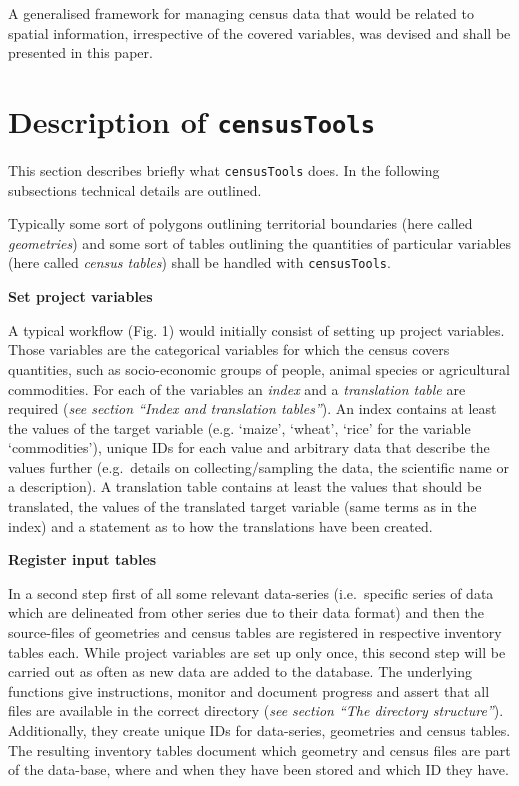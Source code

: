 \documentclass[12pt,]{article}
\begin{document}
A generalised framework for managing census data that would be related to spatial information, irrespective of the covered variables, was devised and shall be presented in this paper.

\hypertarget{description-of-censustools}{%
\section{\texorpdfstring{Description of \texttt{censusTools}}{Description of censusTools}}\label{description-of-censustools}}

This section describes briefly what \texttt{censusTools} does. In the following subsections technical details are outlined.

Typically some sort of polygons outlining territorial boundaries (here called \emph{geometries}) and some sort of tables outlining the quantities of particular variables (here called \emph{census tables}) shall be handled with \texttt{censusTools}.

\textbf{Set project variables}

A typical workflow (Fig. 1) would initially consist of setting up project variables.
Those variables are the categorical variables for which the census covers quantities, such as socio-economic groups of people, animal species or agricultural commodities.
For each of the variables an \emph{index} and a \emph{translation table} are required (\emph{see section ``Index and translation tables''}).
An index contains at least the values of the target variable (e.g. `maize', `wheat', `rice' for the variable `commodities'), unique IDs for each value and arbitrary data that describe the values further (e.g.~details on collecting/sampling the data, the scientific name or a description).
A translation table contains at least the values that should be translated, the values of the translated target variable (same terms as in the index) and a statement as to how the translations have been created.

\textbf{Register input tables}

In a second step first of all some relevant data-series (i.e.~specific series of data which are delineated from other series due to their data format) and then the source-files of geometries and census tables are registered in respective inventory tables each.
While project variables are set up only once, this second step will be carried out as often as new data are added to the database.
The underlying functions give instructions, monitor and document progress and assert that all files are available in the correct directory (\emph{see section ``The directory structure''}).
Additionally, they create unique IDs for data-series, geometries and census tables.
The resulting inventory tables document which geometry and census files are part of the data-base, where and when they have been stored and which ID they have.
\end{document}
